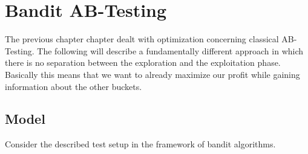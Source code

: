 \documentclass[main.tex]{subfiles}
\begin{document}
\chapter{Bandit AB-Testing}
The previous chapter chapter dealt with optimization concerning classical AB-Testing. The following will describe a fundamentally different approach in which there is no separation between the exploration and the exploitation phase. Basically this means that we want to already maximize our profit while gaining information about the other buckets.
\section{Model}
Consider the described test setup in the framework of bandit algorithms.  
\section{}
\end{document}
